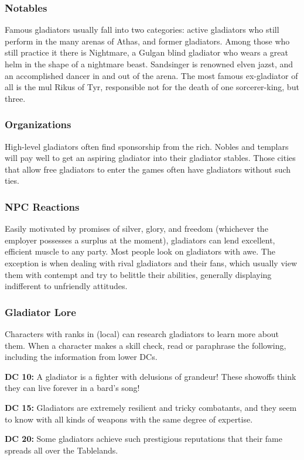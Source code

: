 \subsubsection{Notables}

Famous gladiators usually fall into two categories: active gladiators who still perform in the many arenas of Athas, and former gladiators. Among those who still practice it there is Nightmare, a Gulgan blind gladiator who wears a great helm in the shape of a nightmare beast. Sandsinger is renowned elven jazst, and an accomplished dancer in and out of the arena. The most famous ex-gladiator of all is the mul Rikus of Tyr, responsible not for the death of one sorcerer-king, but three.

\subsubsection{Organizations}

High-level gladiators often find sponsorship from the rich. Nobles and templars will pay well to get an aspiring gladiator into their gladiator stables. Those cities that allow free gladiators to enter the games often have gladiators without such ties.

\subsubsection{NPC Reactions}

Easily motivated by promises of silver, glory, and freedom (whichever the employer possesses a surplus at the moment), gladiators can lend excellent, efficient muscle to any party. Most people look on gladiators with awe. The exception is when dealing with rival gladiators and their fans, which usually view them with contempt and try to belittle their abilities, generally displaying indifferent to unfriendly attitudes.

\subsubsection{Gladiator Lore}

Characters with ranks in  (local) can research gladiators to learn more about them. When a character makes a skill check, read or paraphrase the following, including the information from lower DCs.

\textbf{DC 10:} A gladiator is a fighter with delusions of grandeur! These showoffs think they can live forever in a bard's song!

\textbf{DC 15:} Gladiators are extremely resilient and tricky combatants, and they seem to know with all kinds of weapons with the same degree of expertise.

\textbf{DC 20:} Some gladiators achieve such prestigious reputations that their fame spreads all over the Tablelands.
